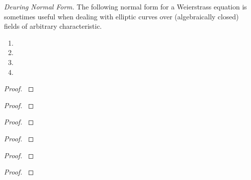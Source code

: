\documentclass[12pt,reqno]{amsart}
\begin{document}
\begin{exe}\label{3.23}
\emph{Deuring Normal Form.}  The following normal form for a Weierstrass equation is sometimes useful when dealing with elliptic curves over (algebraically closed) fields of arbitrary characteristic.
\begin{enumerate}
\item

\item

\item

\item

\end{enumerate}
\begin{proof}\label{s3.23}

\end{proof} 
\end{exe} 

\begin{exe}\label{3.24}

\begin{proof}\label{s3.24}

\end{proof} 
\end{exe} 

\begin{exe}\label{3.25}

\begin{proof}\label{s3.25}

\end{proof} 
\end{exe} 

\begin{exe}\label{3.26}

\begin{proof}\label{s3.26}

\end{proof} 
\end{exe} 

\begin{exe}\label{3.27}

\begin{proof}\label{s3.27}

\end{proof} 
\end{exe} 

\begin{exe}\label{3.28}

\begin{proof}\label{s3.28}

\end{proof} 
\end{exe} 
\end{document}

